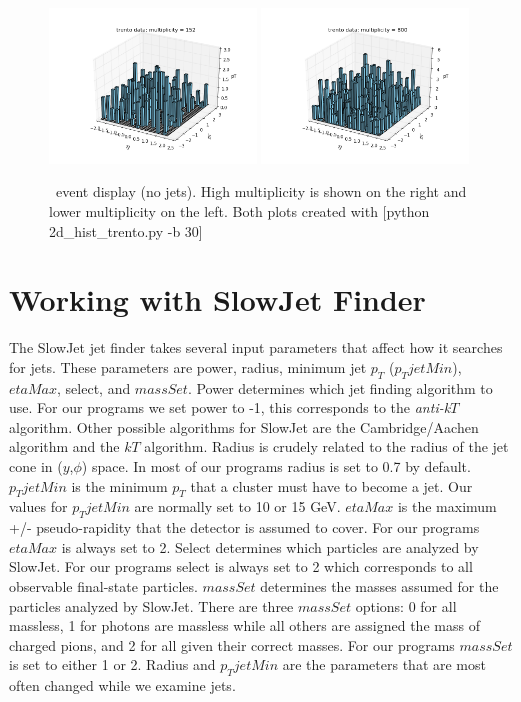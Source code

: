 \documentclass[11pt]{article}
\begin{document}
\begin{figure}[h]
\begin{center}
\includegraphics[width=0.49\textwidth]{2d_hist_trento.png}
\includegraphics[width=0.49\textwidth]{2d_hist_trento2.png}
\label{fig_label}
\caption{\trento\ event display (no jets). High multiplicity is shown on the right and lower multiplicity on the left. Both plots created with [python 2d\_hist\_trento.py -b 30]}
\end{center}
\end{figure}

\section{Working with SlowJet Finder}
%
%
The SlowJet jet finder takes several input parameters that affect how it searches for jets. These parameters are power, radius, minimum jet $p_T$ ($p_TjetMin$), $etaMax$, select, and $massSet$. Power determines which jet finding algorithm to use. For our programs we set power to -1, this corresponds to the {\it anti-k$T$} algorithm. Other possible algorithms for SlowJet are the Cambridge/Aachen algorithm and the $kT$ algorithm. Radius is crudely related to the radius of the jet cone in ($y$,$\phi$) space. In most of our programs radius is set to 0.7 by default. $p_TjetMin$ is the minimum $p_T$ that a cluster must have to become a jet. Our values for $p_TjetMin$ are normally set to 10 or 15 GeV. $etaMax$ is the maximum +/- pseudo-rapidity that the detector is assumed to cover. For our programs $etaMax$ is always set to 2. Select determines which particles are analyzed by SlowJet. For our programs select is always set to 2 which corresponds to all observable final-state particles. $massSet$ determines the masses assumed for the particles analyzed by SlowJet. There are three $massSet$ options: 0 for all massless, 1 for photons are massless while all others are assigned the mass of charged pions, and 2 for all given their correct masses. For our programs $massSet$ is set to either 1 or 2. Radius and $p_TjetMin$ are the parameters that are most often changed while we examine jets.
\end{document}
